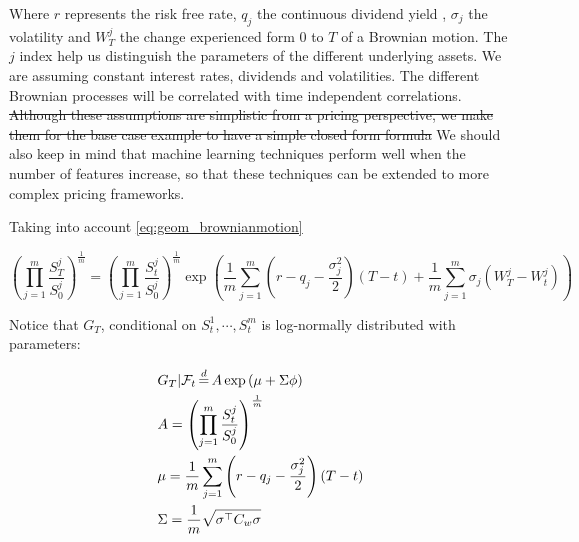 Where $r$ represents the risk free rate, $q_j$ the continuous dividend yield , $\sigma_j$ the volatility and $W_T^j$ the change experienced form $0$ to $T$ of a Brownian motion. The $j$ index help us distinguish the parameters of the different underlying assets.
 We are assuming constant interest rates, dividends and volatilities. The different Brownian processes will be correlated with time independent correlations.  \st{Although these assumptions are simplistic from a pricing perspective, we make them for the base case example to have a simple closed form formula}  We should also keep in mind that machine learning techniques perform well when the number of features increase, so that these techniques can be extended to more complex pricing frameworks. 




Taking into account \ref{eq:geom_brownianmotion}

\begin{equation}\label{eq:geom_digital_distrib}
\left(\prod_{j=1}^m\frac{S_{T}^{j}}{S_{0}^{j}}\right)^{\frac{1}{m}} =\left(\prod_{j=1}^m\frac{S_{t}^{j}}{S_{0}^{j}}\right)^{\frac{1}{m}}\exp\left(\frac{1}{m} \sum_{j=1}^{m}\left(r-q_{j}-\frac{\sigma_{j}^{2}}{2}\right) \left(T-t\right)+\frac{1}{m} \sum_{j=1}^{m} \sigma_{j} \left(W_{T}^{j}-W_{t}^{j}\right)\right) 
\end{equation}

Notice that $G_T$, conditional on $S_t^1,\cdots,S_t^m$ is log-normally distributed with parameters:



\begin{equation} 
\label{eq:geom_digital_distrib_params1}
\begin{aligned} 
& G_T|\mathcal{F}_t \eqdistr A \exp\left(\mu+\Sigma\phi\right)\\
& A = \left(\prod_{j=1}^m\frac{S_{t}^{j}}{S_{0}^{j}}\right)^{\frac{1}{m}} \\
&\mu = \frac{1}{m}\sum_{j=1}^{m}\left(r-q_{j}-\frac{\sigma_{j}^{2}}{2}\right)\left(T-t\right) \\   
& \Sigma=\frac{1}{m}\sqrt{\sigma^{\top} C_{w} \sigma}
\end{aligned}
\end{equation}
 \jorge{$\checkmark$}

